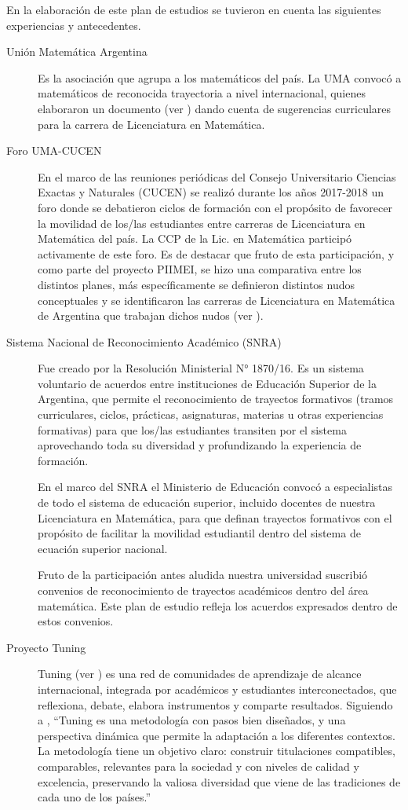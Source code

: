 \documentclass[a4paper, 12pt]{article}
\begin{document}
En la elaboración de este plan de estudios se tuvieron en cuenta las siguientes experiencias y antecedentes.
\begin{description}
 \item[Unión Matemática Argentina]  Es la asociación que agrupa a los matemáticos del país.  La UMA convocó a matemáticos de reconocida trayectoria a nivel internacional, quienes elaboraron un documento (ver \cite{uma}) 
 dando cuenta de sugerencias curriculares para la carrera de Licenciatura en Matemática.
 
 \item[Foro UMA-CUCEN] En el marco de las reuniones periódicas del Consejo Universitario Ciencias Exactas y Naturales (CUCEN) se realizó durante los años 2017-2018 un foro donde se debatieron ciclos de formación con el propósito de favorecer la movilidad de los/las estudiantes entre carreras de Licenciatura en Matemática del país. La CCP de la Lic. en Matemática  participó activamente de este foro. Es de destacar que fruto de esta participación, y como parte del proyecto PIIMEI, se hizo una comparativa entre los distintos planes, más específicamente se definieron distintos nudos conceptuales y se identificaron las carreras de Licenciatura en Matemática de Argentina que trabajan dichos nudos (ver \cite{CCP}). 

\item[Sistema Nacional de Reconocimiento Académico (SNRA)] Fue creado por la Resolución Ministerial N° 1870/16. Es un sistema voluntario de acuerdos entre instituciones de Educación Superior de la Argentina, que permite el reconocimiento de trayectos formativos (tramos curriculares, ciclos, prácticas, asignaturas, materias u otras experiencias formativas) para que los/las estudiantes transiten por el sistema aprovechando toda su diversidad y profundizando la experiencia de formación. 

En el marco del SNRA el Ministerio de Educación convocó a especialistas de todo el sistema de educación superior, incluido docentes de nuestra Licenciatura en Matemática,  para que definan trayectos formativos con el propósito de facilitar la movilidad estudiantil dentro del sistema de ecuación superior nacional. 

Fruto de la participación antes aludida nuestra universidad suscribió convenios de reconocimiento de trayectos académicos dentro del área matemática. Este plan de estudio refleja los acuerdos expresados dentro de estos convenios.

\item[Proyecto Tuning] Tuning (ver \cite{betoine}) es una red de comunidades de aprendizaje de alcance internacional, integrada por académicos y estudiantes interconectados, que reflexiona, debate, elabora instrumentos
y comparte resultados. Siguiendo a \cite{paniagua2013educacion},
 ``Tuning es una metodología con pasos bien diseñados, y una perspectiva dinámica que permite la adaptación a los diferentes contextos. La metodología tiene un objetivo claro: construir titulaciones compatibles, comparables, relevantes para la sociedad y con niveles
de calidad y excelencia, preservando la valiosa diversidad que viene de las
tradiciones de cada uno de los países.'' 


\end{description}
\end{document}

